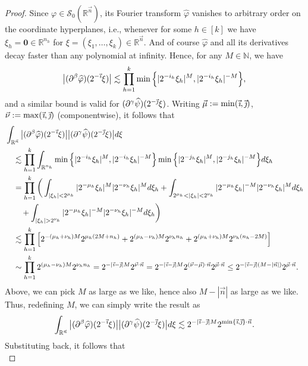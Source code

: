 \documentclass[11pt, reqno]{amsart}
\theoremstyle{definition}
\theoremstyle{remark}
\numberwithin{equation}{section}
\newcommand{\N}{\mathbb N}
\newcommand{\R}{\mathbb R}
\newcommand{\Sc}{\mathscr S}
\newcommand{\vi}{\vec{\textit{\i}}}
\newcommand{\vj}{\vec{\textit{\j}}}
\newcommand{\vmu}{\vec\mu}
\newcommand{\vn}{\vec n}
\newcommand{\vnu}{\vec\nu}
\newcommand{\abs}[1]{|#1|}
\begin{document}
\begin{proof}
Since $\varphi\in\Sc_0(\R^{\vn})$, its Fourier transform $\widehat\varphi$ vanishes to arbitrary order on the coordinate hyperplanes, i.e., whenever for some $h\in[k]$ we have $\xi_h=\mathbf 0\in\R^{n_h}$ for $\xi=(\xi_1,\ldots,\xi_k)\in\R^{\vn}$. And of course $\widehat\varphi$ and all its derivatives decay faster than any polynomial at infinity. Hence, for any $M\in\N$, we have
\begin{equation*}
\big|(\partial^\beta\widehat\varphi)(2^{-\vi}\xi)\big|\lesssim\prod_{h=1}^k\min
\Big\{\abs{2^{-i_h}\xi_h}^M,\abs{2^{-i_h}\xi_h}^{-M}\Big\},
\end{equation*}
and a similar bound is valid for $(\partial^\gamma\widehat\psi)(2^{-\vj}\xi)$. Writing $\vmu:=\min(\vi,\vj)$, $\vnu:=\max(\vi,\vj)$ (componentwise), it follows that
\begin{align*}
&\int_{\R^{\vn}} \big|(\partial^\beta\widehat\varphi)(2^{-\vi}\xi)\big|
\big|(\partial^\gamma\widehat\psi)(2^{-\vj}\xi)\big| d\xi \\
&\quad\lesssim\prod_{h=1}^k
\int_{\R^{n_h}}\min\Big\{\abs{2^{-i_h}\xi_h}^M,\abs{2^{-i_h}\xi_h}^{-M}\Big\}
\min\Big\{\abs{2^{-j_h}\xi_h}^M,\abs{2^{-j_h}\xi_h}^{-M}\Big\} d\xi_h \\
&\quad=\prod_{h=1}^k
\bigg( \int_{\abs{\xi_h}<2^{\mu_h}}
\abs{2^{-\mu_h}\xi_h}^M\abs{2^{-\nu_h}\xi_h}^M d\xi_h
+\int_{2^{\mu_h}<\abs{\xi_h}<2^{\nu_h}}
\abs{2^{-\mu_h}\xi_h}^{-M}\abs{2^{-\nu_h}\xi_h}^M d\xi_h \Big. \\
&\quad\quad \Big.
+\int_{\abs{\xi_h}>2^{\nu_h}}
\abs{2^{-\mu_h}\xi_h}^{-M}\abs{2^{-\nu_h}\xi_h}^{-M} d\xi_h \bigg)  \\
&\quad\lesssim\prod_{h=1}^k
\Big[2^{-(\mu_h+\nu_h)M}2^{\mu_h(2M+n_h)}+2^{(\mu_h-\nu_h)M}2^{\nu_h n_h}+2^{(\mu_h+\nu_h)M}2^{\nu_h(n_h-2M)}\Big] \\
&\quad\sim\prod_{h=1}^k 2^{(\mu_h-\nu_h)M}2^{\nu_h n_h}
=2^{-\abs{\vi-\vj}M}2^{\vnu\cdot\vn}
=2^{-\abs{\vi-\vj}M}2^{(\vnu-\vmu)\cdot\vn}2^{\vmu\cdot\vn}
\leq 2^{-\abs{\vi-\vj}(M-\abs{\vn})}2^{\vmu\cdot\vn}.
\end{align*}
Above, we can pick $M$ as large as we like, hence also $M-\abs{\vn}$ as large as we like. Thus, redefining $M$, we can simply write the result as
\begin{equation*}
\int_{\R^{\vn}} \big|(\partial^\beta\widehat\varphi)(2^{-\vi}\xi)\big|
\big|(\partial^\gamma\widehat\psi)(2^{-\vj}\xi)\big| d\xi
\lesssim 2^{-\abs{\vi-\vj}M}2^{\min\{\vi,\vj\}\cdot\vn}.
\end{equation*}
Substituting back, it follows that
\begin{equation*}

\end{equation*}
\end{proof}
\end{document}
